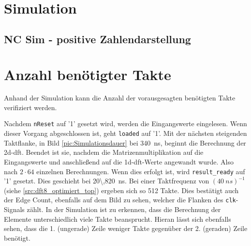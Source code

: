 \section{Simulation}
 \subsection{NC Sim - positive Zahlendarstellung}
 
 \section{Anzahl benötigter Takte}
 Anhand der Simulation kann die Anzahl der vorausgesagten benötigten Takte verifiziert werden. 
 
 Nachdem \texttt{nReset} auf '1' gesetzt wird, werden die Eingangswerte
 eingelesen. Wenn dieser Vorgang abgeschlossen ist, geht \texttt{loaded} auf '1'. Mit der nächsten steigenden Taktflanke, in Bild \ref{pic:Simulationsdauer} bei 
 \SI{340}{ns}, beginnt die Berechnung
 der \gls{2d-dft}. Beendet ist sie, nachdem die Matrizenmultiplikation auf die Eingangswerte und anschließend auf die \gls{1d-dft}-Werte angewandt wurde. Also nach $2 \cdot 64$
 einzelnen Berechnungen. Wenn dies erfolgt ist, wird \texttt{result\_ready} auf '1' gesetzt. Dies geschieht bei \SI{20\,820}{ns}. Bei einer Taktfrequenz von $(\SI{40}{ns})^{-1}$
 (siehe \ref{src:dft8_optimiert_top}) ergeben sich so 512 Takte. Dies bestätigt auch der Edge Count, ebenfalls auf dem Bild zu sehen, welcher die Flanken des \texttt{clk}-Signals 
 zählt. In der Simulation ist zu erkennen, dass die Berechnung der Elemente 
 unterschiedlich viele Takte beansprucht. Hieran lässt sich ebenfalls sehen, dass die 1. (ungerade) Zeile weniger Takte gegenüber der 2. (geraden) Zeile benötigt. 
 
 
